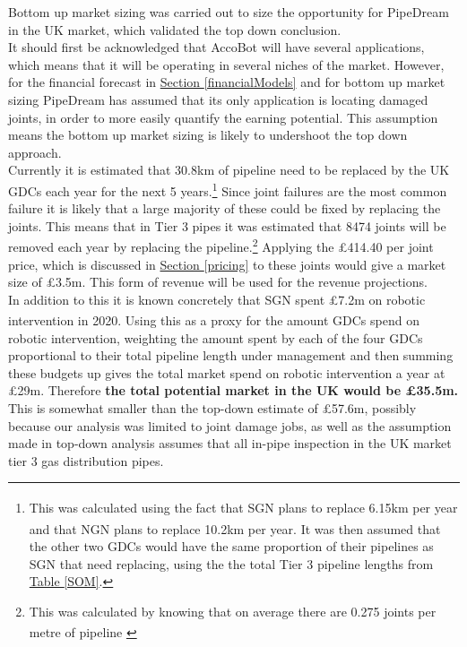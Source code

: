 \documentclass[11pt]{article}		%
\newcommand{\supercite}[1]{\textsuperscript{\cite{#1}}}		%
\newcommand{\tableref}[1]{\hyperref[#1]{Table \ref*{#1}}}     %
\newcommand{\sectref}[1]{\hyperref[#1]{Section \ref*{#1}}}     %
\begin{document}
        Bottom up market sizing was carried out to size the opportunity for PipeDream in the UK market, which validated the top down conclusion.
        \\
        \hspace*{3ex}It should first be acknowledged that AccoBot will have several applications, which means that it will be operating in several niches of the market. However, for the financial forecast in \sectref{financialModels} and for bottom up market sizing PipeDream has assumed that its only application is locating damaged joints, in order to more easily quantify the earning potential. This assumption means the bottom up market sizing is likely to undershoot the top down approach.
        \\
        \hspace*{3ex}Currently it is estimated that 30.8km of pipeline need to be replaced by the UK GDCs each year for the next 5 years.\footnote{ This was calculated using the fact that SGN plans to replace 6.15km per year \supercite{SGN_Southern}\supercite{SGN_Scotland} and that NGN plans to replace 10.2km per year\supercite{NGN_decisions}. It was then assumed that the other two GDCs would have the same proportion of their pipelines as SGN that need replacing, using the the total Tier 3 pipeline lengths from \tableref{SOM}.} Since joint failures are the most common failure it is likely that a large majority of these could be fixed by replacing the joints. This means that in Tier 3 pipes it was estimated that 8474 joints will be removed each year by replacing the pipeline.\footnote{This was calculated by knowing that on average there are 0.275 joints per metre of pipeline \supercite{SGN_Southern}} %
        Applying the £414.40 per joint price, which is discussed in \sectref{pricing}  to these joints would give a market size of £3.5m. This form of revenue will be used for the revenue projections.
        \\
        \hspace*{3ex}In addition to this it is known concretely that SGN spent £7.2m on robotic intervention in 2020.\supercite{SGN_Scotland}\supercite{SGN_Southern} Using this as a proxy for the amount GDCs spend on robotic intervention, weighting the amount spent by each of the four GDCs proportional to their total pipeline length under management and then summing these budgets up gives the total market spend on robotic intervention a year at £29m. Therefore \textbf{the total potential market in the UK would be £35.5m.} This is somewhat smaller than the top-down estimate of £57.6m, possibly because our analysis was limited to joint damage jobs, as well as the assumption made in top-down analysis assumes that all in-pipe inspection in the UK market tier 3 gas distribution pipes. 
    
\end{document}
